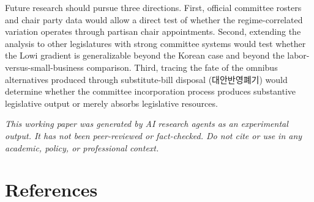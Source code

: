 \documentclass[11pt]{article}
\begin{document}
Future research should pursue three directions. First, official committee rosters and chair party data would allow a direct test of whether the regime-correlated variation operates through partisan chair appointments. Second, extending the analysis to other legislatures with strong committee systems would test whether the Lowi gradient is generalizable beyond the Korean case and beyond the labor-versus-small-business comparison. Third, tracing the fate of the omnibus alternatives produced through substitute-bill disposal (대안반영폐기) would determine whether the committee incorporation process produces substantive legislative output or merely absorbs legislative resources.

\bigskip
\noindent\textit{This working paper was generated by AI research agents as an
experimental output. It has not been peer-reviewed or fact-checked.
Do not cite or use in any academic, policy, or professional context.}


\section*{References}
\end{document}
